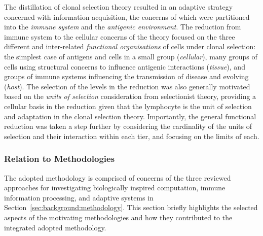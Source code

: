 The distillation of clonal selection theory resulted in an adaptive strategy concerned with information acquisition, the concerns of which were partitioned into the \emph{immune system} and the \emph{antigenic environment}. 
The reduction from immune system to the cellular concerns of the theory focused on the three different and inter-related \emph{functional organisations} of cells under clonal selection: the simplest case of antigens and cells in a small group (\emph{cellular}), many groups of cells using structural concerns to influence antigenic interactions (\emph{tissue}), and groups of immune systems influencing the transmission of disease and evolving (\emph{host}). The selection of the levels in the reduction was also generally motivated based on the \emph{units of selection} consideration from selectionist theory, providing a cellular basis in the reduction given that the lymphocyte is the unit of selection and adaptation in the clonal selection theory.
Importantly, the general functional reduction was taken a step further by considering the cardinality of the units of selection and their interaction within each tier, and focusing on the limits of each.

%
%
\subsubsection{Relation to Methodologies}
The adopted methodology is comprised of concerns of the three reviewed approaches for investigating biologically inspired computation, immune information processing, and adaptive systems in Section~\ref{sec:background:methodology}. This section briefly highlights the selected aspects of the motivating methodologies and how they contributed to the integrated adopted methodology.

